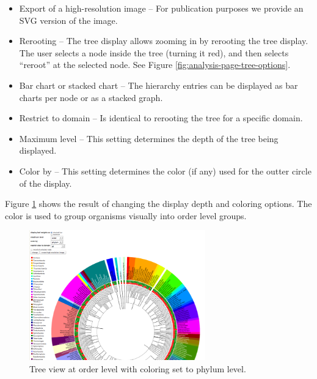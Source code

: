 \documentclass[12pt,fullpage]{report}
\begin{document}
\begin{itemize}

\item Export of a high-resolution image --
For publication purposes we provide an SVG version of the image.

\item Rerooting --
The tree display allows zooming in by rerooting the tree display. The user selects a node inside the tree (turning it red), and then selects ``reroot'' at the selected node. See Figure \ref{fig:analysis-page-tree-options}.

\item Bar chart or stacked chart --
The hierarchy entries can be displayed as bar charts per node or as a stacked graph.

\item Restrict to domain --
Is identical to rerooting the tree for a specific domain.

\item Maximum level --
This setting determines the depth of the tree being displayed.

\item Color by --
This setting determines the color (if any) used for the outter circle of the display.
\end{itemize}

Figure \ref{fig:analysis-page-tree-order-level-with-phylum-colors} shows the result of changing the display depth and coloring options. The color is used to group organisms visually into order level groups.



\begin{figure}
\begin{center}
\includegraphics[width=3in]{Images/analysis-page-tree-order-level-with-phylum-colors.png}
\end{center}
\caption{
Tree view at order level with coloring set to phylum level.
}
\label{fig:analysis-page-tree-order-level-with-phylum-colors}
\end{figure}
\end{document}
